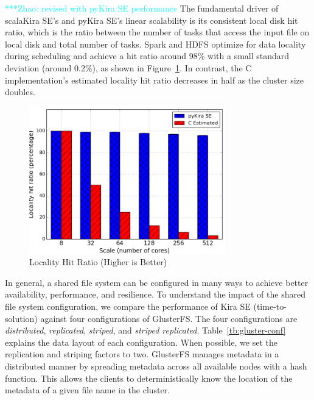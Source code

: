 \documentclass[10pt,journal,compsoc]{IEEEtran}
\newcommand{\zhaonote}[1]{{\textcolor{cyan}    { ***Zhao:      #1 }}}
\newcommand{\zhaonote}[1]{}
\begin{document}
\zhaonote{revised with pyKira SE performance}
The fundamental driver of scalaKira SE's and pyKira SE's linear scalability is its consistent local disk
hit ratio, which is the ratio between the number of tasks that access the input file 
on local disk and total number of tasks. Spark and HDFS optimize for data locality during scheduling and achieve a
hit ratio around 98\% with a small standard deviation (around 0.2\%), as shown in Figure~\ref{fig:locality}. 
In contrast, the C implementation's estimated locality hit ratio decreases in half as the cluster size doubles.

\begin{figure}[h]
	\begin{center}
		\includegraphics[width=85mm]{pictures/locality}
		\caption{Locality Hit Ratio (Higher is Better)
		\label{fig:locality}}
  	\end{center}
\end{figure}

In general, a shared file system can be configured in many ways to achieve better
availability, performance, and resilience. To understand the impact of the shared
file system configuration, we compare the performance of Kira SE (time-to-solution)
against four configurations of GlusterFS. The four configurations are
\emph{distributed}, \emph{replicated}, \emph{striped}, and \emph{striped replicated}. 
Table~\ref{tb:gluster-conf} explains the data layout of each configuration.
When possible, we set the replication and striping factors to two.
GlusterFS manages metadata in a distributed manner by spreading metadata across
all available nodes with a hash function. This allows the clients to deterministically
know the location of the metadata of a given file name in the cluster.
\end{document}
